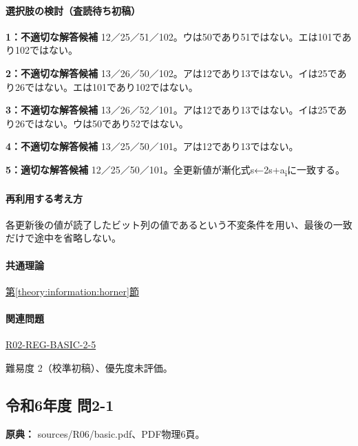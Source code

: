 \paragraph{選択肢の検討（査読待ち初稿）}\mbox{}\par

\noindent\textbf{1：不適切な解答候補} 12／25／51／102。ウは50であり51ではない。エは101であり102ではない。\par

\noindent\textbf{2：不適切な解答候補} 13／26／50／102。アは12であり13ではない。イは25であり26ではない。エは101であり102ではない。\par

\noindent\textbf{3：不適切な解答候補} 13／26／52／101。アは12であり13ではない。イは25であり26ではない。ウは50であり52ではない。\par

\noindent\textbf{4：不適切な解答候補} 13／25／50／101。アは12であり13ではない。\par

\noindent\textbf{5：適切な解答候補} 12／25／50／101。全更新値が漸化式s←2s+a\textsubscript{i}に一致する。\par

\paragraph{再利用する考え方} 各更新後の値が読了したビット列の値であるという不変条件を用い、最後の一致だけで途中を省略しない。

\paragraph{共通理論} \hyperref[theory:information:horner]{第\ref*{theory:information:horner}節}

\paragraph{関連問題} \hyperref[q:r02-reg-basic-2-5]{R02-REG-BASIC-2-5}

\par 難易度 2（校準初稿）、優先度未評価。

\subsection{令和6年度 問2-1}
\label{q:r06-reg-basic-2-1}

\noindent\textbf{原典：} sources/R06/basic.pdf、PDF物理6頁。


